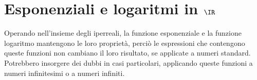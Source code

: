 %  
% 
% 
% 
% 
% 
% 
% 
% 
% 
% 
% 
% 


\section{Esponenziali e logaritmi in \(\IR\)}
\label{sec:esplog_IR}
Operando nell'insieme degli iperreali, la funzione esponenziale e la 
funzione logaritmo mantengono le loro proprietà, perciò le espressioni che 
contengono queste funzioni non cambiano il loro risultato, se applicate a 
numeri standard. Potrebbero insorgere dei dubbi in casi particolari, 
applicando queste funzioni a numeri infinitesimi o a numeri infiniti.


